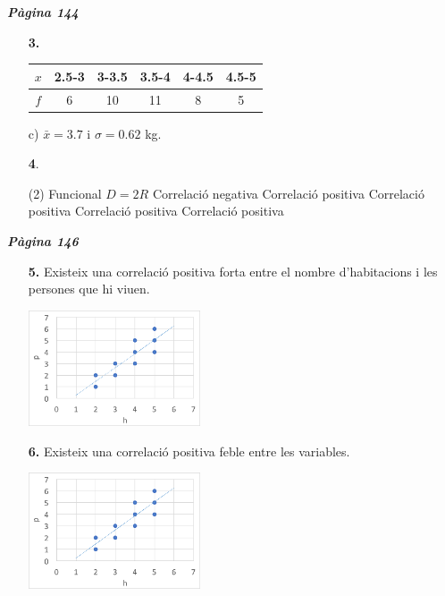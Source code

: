 \documentclass[a4paper, pdf, twoside]{book}
\begin{document}
\begin{multicols}{2}
{\textbf{\em Pàgina 144}} \hrulefill
\begin{enumerate}
\vspace{0.25cm}
\item[\fontfamily{phv}\selectfont\color{blue}\textbf{3. }]  \scalebox{0.6}{\simbolclau } 
\begin {tabular}{c|c|c|c|c|c}\hline $x$ & 2.5-3 & 3-3.5 & 3.5-4 & 4-4.5 & 4.5-5\\\hline $f$ & 6 & 10 & 11 & 8 & 5 \\ \end {tabular} \par c) $\bar x =3.7$ i $\sigma =0.62$ kg. 
 \end{enumerate}
\begin{enumerate}
\vspace{0.25cm}



 \item[\fontfamily{phv}\selectfont\color{blue}\textbf{4}. ] 
 \begin{tasks}[column-sep=1em, item-indent=1.3333em](2)
	 \task Funcional $D=2R$
	 \task Correlació negativa
	 \task Correlació positiva
	 \task Correlació positiva
	 \task Correlació positiva
	 \task Correlació positiva
\end{tasks}
 \end{enumerate}
\vspace{0.3cm}


{\textbf{\em Pàgina 146}} \hrulefill
\begin{enumerate}
\vspace{0.25cm}
\item[\fontfamily{phv}\selectfont\color{blue}\textbf{5. }] 
Existeix una correlació positiva forta entre el nombre d'habitacions i les persones que hi viuen.\par \includegraphics [width=0.4\textwidth ]{img-sol/t11-5}
 \end{enumerate}
\begin{enumerate}
\vspace{0.25cm}
\item[\fontfamily{phv}\selectfont\color{blue}\textbf{6. }] 
Existeix una correlació positiva feble entre les variables.\par \includegraphics [width=0.4\textwidth ]{img-sol/t11-5}
\vspace{0.25cm}



\end{enumerate}
\end{multicols}
\end{document}
